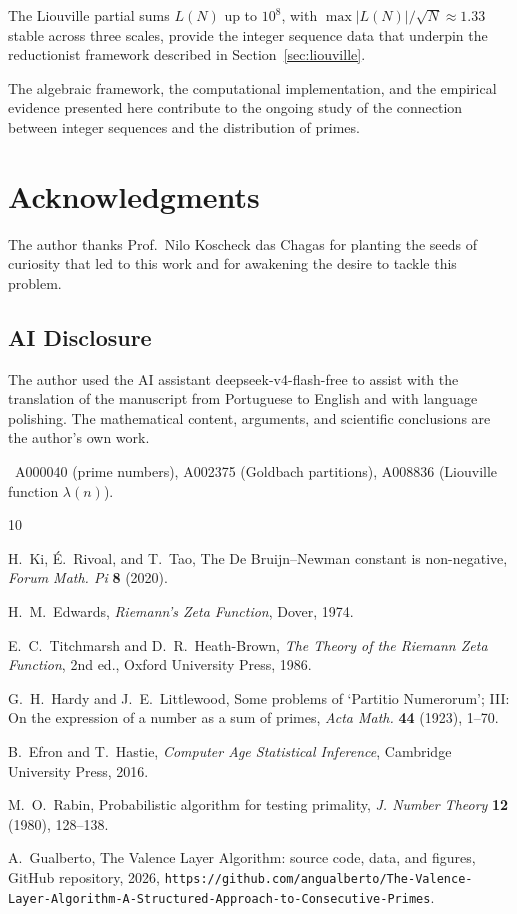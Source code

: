 \documentclass[12pt,a4paper]{article}
\theoremstyle{plain}
\begin{document}
The Liouville partial sums $L(N)$ up to $10^{8}$,
with $\max|L(N)|/\sqrt{N}\approx1.33$ stable across three scales,
provide the integer sequence data that underpin the reductionist
framework described in Section~\ref{sec:liouville}.

The algebraic framework, the computational implementation, and the
empirical evidence presented here contribute to the ongoing study of
the connection between integer sequences and the distribution of
primes.

\section{Acknowledgments}
The author thanks Prof.\ Nilo Koscheck das Chagas for planting the seeds
of curiosity that led to this work and for awakening the desire to
tackle this problem.

\subsection*{AI Disclosure}
The author used the AI assistant deepseek-v4-flash-free to assist
with the translation of the manuscript from Portuguese to English
and with language polishing.  The mathematical content, arguments,
and scientific conclusions are the author's own work.

\
A000040 (prime numbers),
A002375 (Goldbach partitions),
A008836 (Liouville function $\lambda(n)$).

\begin{thebibliography}{10}

 H.~Ki, \'E.~Rivoal, and T.~Tao,
  The De Bruijn--Newman constant is non-negative,
  {\it Forum Math. Pi} \textbf{8} (2020).

 H.~M.~Edwards,
  {\it Riemann's Zeta Function}, Dover, 1974.

 E.~C.~Titchmarsh and D.~R.~Heath-Brown,
  {\it The Theory of the Riemann Zeta Function},
  2nd ed., Oxford University Press, 1986.

 G.~H.~Hardy and J.~E.~Littlewood,
  Some problems of `Partitio Numerorum'; III: On the expression
  of a number as a sum of primes,
  {\it Acta Math.} \textbf{44} (1923), 1--70.

 B.~Efron and T.~Hastie,
  {\it Computer Age Statistical Inference}, Cambridge University Press, 2016.

 M.~O.~Rabin,
  Probabilistic algorithm for testing primality,
  {\it J. Number Theory} \textbf{12} (1980), 128--138.

 A.~Gualberto,
  The Valence Layer Algorithm: source code, data, and figures,
  GitHub repository, 2026,
  \texttt{https://github.com/angualberto/The-Valence-Layer-Algorithm-A-Structured-Approach-to-Consecutive-Primes}.

\end{thebibliography}
\end{document}
